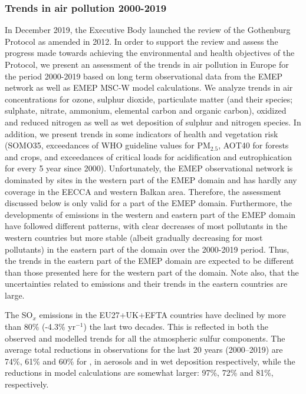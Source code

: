 \subsubsection*{Trends in air pollution 2000-2019}
In December 2019, the Executive Body launched the review of the Gothenburg Protocol as amended in 2012. In order to support the review and assess the progress made towards achieving the environmental and health objectives of the Protocol, we present an assessment of the trends in air pollution in Europe for the period 2000-2019 based on long term observational data from the EMEP network as well as EMEP MSC-W model calculations.
We analyze trends in air concentrations for ozone, sulphur dioxide, particulate matter (and their species; sulphate, nitrate, ammonium, elemental carbon and organic carbon), oxidized and reduced nitrogen as well as wet deposition of sulphur and nitrogen species. In addition, we present trends in some indicators of health and vegetation risk (SOMO35, exceedances of WHO guideline values for PM$_{2.5}$, AOT40 for forests and crops, and exceedances of critical loads for acidification and eutrophication for every 5 year since 2000).
Unfortunately, the EMEP observational network is dominated by sites in the western part of the EMEP domain and has hardly any coverage in the EECCA and western Balkan area. Therefore, the assessment discussed below is only valid for a part of the EMEP domain. Furthermore, the developments of emissions in the western and eastern part of the EMEP domain have followed different patterns, with clear decreases of most pollutants in the western countries but more stable (albeit gradually decreasing for most pollutants) in the eastern part of the domain over the 2000-2019 period. Thus, the trends in the eastern part of the EMEP domain are expected to be different than those presented here for the western part of the domain. Note also, that the uncertainties related to emissions and their trends in the eastern countries are large.

The SO$_x$ emissions in the EU27+UK+EFTA countries have declined by more than 80\% (-4.3\% yr$^{-1}$) the last two decades. This is reflected in both the observed and modelled trends for all the atmospheric sulfur components. The average total reductions in observations for the last 20 years (2000--2019) are 74\%, 61\% and 60\% for \soii, \soiv in aerosols and in wet deposition respectively, while the reductions in model calculations are somewhat larger: 97\%, 72\% and 81\%, respectively.

